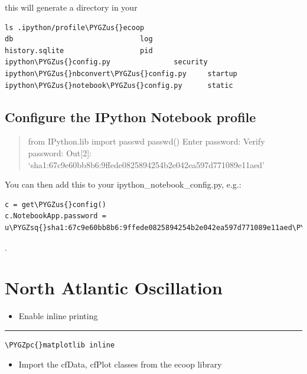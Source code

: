 \documentclass[letterpaper,10pt,english]{sphinxmanual}
\def\PYGZus{\char`\_}
\def\PYGZpc{\char`\%}
\def\PYGZsq{\char`\'}
\renewcommand\PYGZsq{\textquotesingle}
\begin{document}
this will generate a directory  in your 

\begin{Verbatim}[commandchars=\\\{\}]
ls .ipython/profile\PYGZus{}ecoop
db                              log
history.sqlite                  pid
ipython\PYGZus{}config.py               security
ipython\PYGZus{}nbconvert\PYGZus{}config.py     startup
ipython\PYGZus{}notebook\PYGZus{}config.py      static
\end{Verbatim}


\section{Configure the IPython Notebook profile}
\label{getting_started:configure-an-ipython-notebook-profile}\label{getting_started:configure-the-ipython-notebook-profile}\begin{quote}

from IPython.lib import passwd
passwd()
Enter password:
Verify password:
Out{[}2{]}: `sha1:67c9e60bb8b6:9ffede0825894254b2e042ea597d771089e11aed'
\end{quote}

You can then add this to your ipython\_notebook\_config.py, e.g.:

\begin{Verbatim}[commandchars=\\\{\}]
c = get\PYGZus{}config()
c.NotebookApp.password =
u\PYGZsq{}sha1:67c9e60bb8b6:9ffede0825894254b2e042ea597d771089e11aed\PYGZsq{}
\end{Verbatim}

{\hyperref[NAO:nao]{\emph{}}}.


\chapter{North Atlantic Oscillation}
\label{NAO::doc}\label{NAO:north-atlantic-oscillation}\label{NAO:nao}\begin{itemize}
\item {} 
Enable inline printing

\end{itemize}


\bigskip\hrule{}\bigskip


\begin{Verbatim}[commandchars=\\\{\}]
\PYGZpc{}matplotlib inline
\end{Verbatim}
\begin{itemize}
\item {} 
Import the cfData, cfPlot classes from the ecoop library

\end{itemize}
\end{document}
